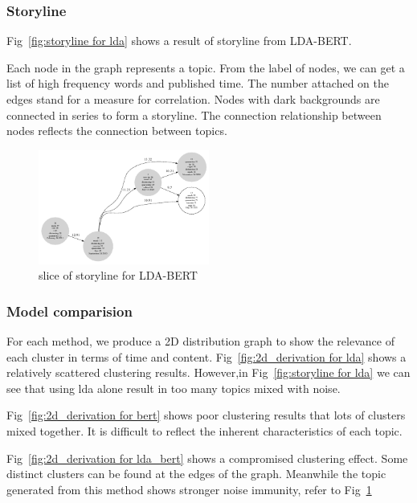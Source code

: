 \subsubsection{Storyline}
Fig~\ref{fig:storyline for lda} shows a result of storyline from LDA-BERT.  

Each node in the graph represents a topic. From the label of nodes, we can get a list of high frequency words and published time. The number attached on the edges stand for a measure for correlation. Nodes with dark backgrounds are connected in series to form a storyline. The connection relationship between nodes reflects the connection between topics.

\begin{figure}[h]
\centering
\includegraphics[width=0.5\textwidth]{imgs/lda_bert/storyline_lda_bert.gv.pdf}
\caption{slice of storyline for LDA-BERT}
\label{fig:storyline for lda_bert}
\end{figure}


\subsubsection{Model comparision}
For each method, we produce a 2D distribution graph to show the relevance of each cluster in terms of time and content. Fig~\ref{fig:2d_derivation for lda} shows a relatively scattered clustering results. However,in Fig~\ref{fig:storyline for lda} we can see that using lda alone result in too many topics mixed with noise. 

Fig~\ref{fig:2d_derivation for bert} shows poor clustering results that lots of clusters mixed together. It is difficult to reflect the inherent characteristics of each topic.

Fig~\ref{fig:2d_derivation for lda_bert} shows a compromised clustering effect. Some distinct clusters can be found at the edges of the graph. Meanwhile the topic generated from this method shows stronger noise immunity, refer to Fig~\ref{fig:storyline for lda_bert}

